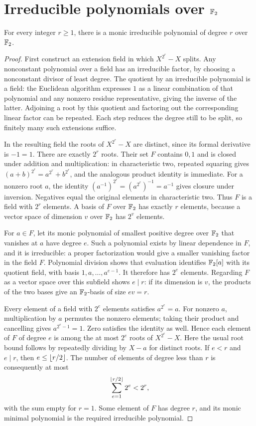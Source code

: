 \section{Irreducible polynomials over \texorpdfstring{$\mathbb F_2$}{F2}}
\label{sec:field-existence}

\begin{lemma}\label{lem:field-existence}
For every integer $r\ge1$, there is a monic irreducible polynomial of
degree $r$ over $\mathbb F_2$.
\end{lemma}

\begin{proof}
First construct an extension field in which $X^{2^r}-X$ splits.  Any
nonconstant polynomial over a field has an irreducible factor, by choosing
a nonconstant divisor of least degree.  The quotient by an irreducible
polynomial is a field: the Euclidean algorithm expresses $1$ as a linear
combination of that polynomial and any nonzero residue representative,
giving the inverse of the latter.  Adjoining a root by this quotient and
factoring out the corresponding linear factor can be repeated.  Each step
reduces the degree still to be split, so finitely many such extensions
suffice.

In the resulting field the roots of $X^{2^r}-X$ are distinct, since its
formal derivative is $-1=1$.  There are exactly $2^r$ roots.  Their set
$F$ contains $0,1$ and is closed under addition and multiplication: in
characteristic two, repeated squaring gives
$(a+b)^{2^r}=a^{2^r}+b^{2^r}$, and the analogous product identity is
immediate.  For a nonzero root $a$, the identity
$(a^{-1})^{2^r}=(a^{2^r})^{-1}=a^{-1}$ gives closure under inversion.
Negatives equal the original elements in characteristic two.  Thus $F$
is a field with $2^r$ elements.  A basis of $F$ over $\mathbb F_2$ has exactly
$r$ elements, because a vector space of dimension $v$ over $\mathbb F_2$ has
$2^v$ elements.

For $a\in F$, let its monic polynomial of smallest positive degree over
$\mathbb F_2$ that vanishes at $a$ have degree $e$.  Such a polynomial exists by
linear dependence in $F$, and it is irreducible: a proper factorization
would give a smaller vanishing factor in the field $F$.  Polynomial
division shows that evaluation identifies $\mathbb F_2[a]$ with its quotient
field, with basis $1,a,\ldots,a^{e-1}$.  It therefore has $2^e$ elements.
Regarding $F$ as a vector space over this subfield shows $e\mid r$:
if its dimension is $v$, the products of the two bases give an
$\mathbb F_2$-basis of size $ev=r$.

Every element of a field with $2^e$ elements satisfies $a^{2^e}=a$.
For nonzero $a$, multiplication by $a$ permutes the nonzero elements;
taking their product and cancelling gives $a^{2^e-1}=1$.  Zero satisfies
the identity as well.  Hence each element of $F$ of degree $e$ is among
the at most $2^e$ roots of $X^{2^e}-X$.  Here the usual root bound follows
by repeatedly dividing by $X-a$ for distinct roots.  If $e<r$ and
$e\mid r$, then $e\le\left\lfloor r/2\right\rfloor$.  The number of elements of degree
less than $r$ is consequently at most
\[
 \sum_{e=1}^{\left\lfloor r/2\right\rfloor}2^e<2^r,
\]
with the sum empty for $r=1$.  Some element of $F$ has degree $r$, and
its monic minimal polynomial is the required irreducible polynomial.
\end{proof}
